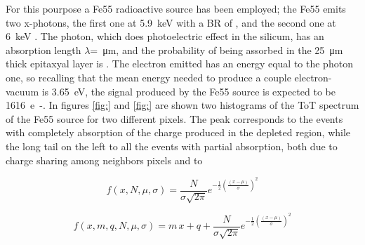        For this pourpose a Fe55 radioactive source has been employed; the Fe55 emits two x-photons, the first one at \SI{5.9}{keV} with a BR of , and the second one at \SI{6}{keV} .
        The photon, which does photoelectric effect in the silicum, has an  absorption length $\lambda$=\SI{}{\um}, and the probability of being assorbed in the \SI{25}{\um} thick epitaxyal layer is .
        The electron emitted has an energy equal to the photon one, so recalling that the mean energy needed to produce a couple electron-vacuum is \SI{3.65}{eV}, the signal produced by the Fe55 source is expected to be \SI{1616}{e-}.
        In figures \ref{fig:} and \ref{fig:} are shown two histograms of the ToT spectrum of the Fe55 source for two different pixels. The peak corresponds to the events with completely absorption of the charge produced in the depleted region, while the long tail on the left to all the events with partial absorption, both due to charge sharing among neighbors pixels and to 
        
        \begin{equation}
            f(x, N, \mu, \sigma) = \frac{N}{\sigma \sqrt{2\pi}} e^{-\frac{1}{2}(\frac{(x-\mu)}{\sigma})^2}
        \end{equation} 

        \begin{equation}
            f(x, m, q, N, \mu, \sigma) = m\,x + q + \frac{N}{\sigma \sqrt{2\pi}} e^{-\frac{1}{2}(\frac{(x-\mu)}{\sigma})^2}
        \end{equation}   
         
